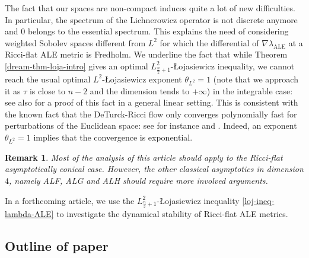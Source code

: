 \documentclass[a4paper,11pt,reqno]{amsart}
\newtheorem{rk}[defn]{Remark}
\numberwithin{equation}{section}
\begin{document}
	The fact that our spaces are non-compact induces quite a lot of new difficulties. In particular, the spectrum of the Lichnerowicz operator is not discrete anymore and $0$ belongs to the essential spectrum. This explains the need of considering weighted Sobolev spaces different from $L^2$ for which the differential of $\nabla\lambda_{\operatorname{ALE}}$ at a Ricci-flat ALE metric is Fredholm. We underline the fact that while Theorem \ref{dream-thm-loja-intro} gives an optimal $L^2_{\frac{n}{2}+1}$-\L ojasiewicz inequality, we cannot reach the usual optimal $L^2$-\L{}ojasiewicz exponent $\theta_{L^2} = 1$ (note that we approach it as $\tau$ is close to $n-2$ and the dimension tends to $+\infty$) in the integrable case: see also \cite[Theorem $2.1$]{Har-jen-Loja-Hil} for a proof of this fact in a general linear setting. This is consistent with the known fact that the DeTurck-Ricci flow only converges polynomially fast for perturbations of the Euclidean space: see for instance \cite{Sch-Sch-Sim} and \cite{app-scal}. Indeed, an exponent $\theta_{L^2} =1$ implies that the convergence is exponential.
	
	
	\begin{rk}
		Most of the analysis of this article should apply to the Ricci-flat asymptotically conical case. However, the other classical asymptotics in dimension $4$, namely ALF, ALG and ALH should require more involved arguments.
	\end{rk}
	
	In a forthcoming article, we use the $L^2_{\frac{n}{2}+1}$-\L{}ojasiewicz inequality \eqref{loj-ineq-lambda-ALE} to investigate the dynamical stability of Ricci-flat ALE metrics. 
\\

	
	

	
	
	
	
	\subsection*{Outline of paper}
	
\end{document}
